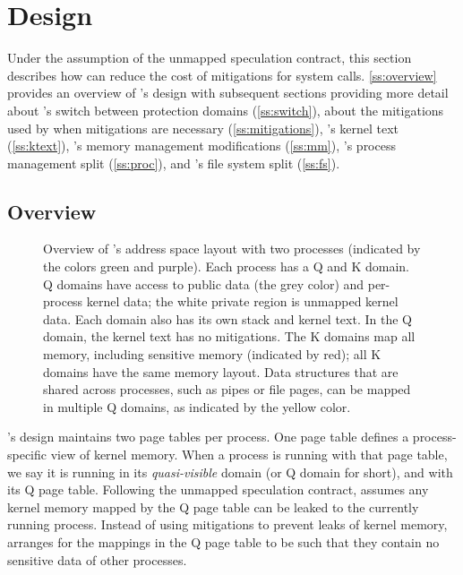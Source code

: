 \section{Design}
\label{s:design}

Under the assumption of the unmapped speculation contract, this
section describes how \sys can reduce the cost of mitigations for
system calls.  \autoref{ss:overview} provides an overview of \sys's
design with subsequent sections providing more detail about \sys's
switch between protection domains (\autoref{ss:switch}), about the
mitigations used by \sys when mitigations are necessary
(\autoref{ss:mitigations}), \sys's kernel text (\autoref{ss:ktext}),
\sys's memory management modifications (\autoref{ss:mm}), \sys's
process management split (\autoref{ss:proc}), and \sys's file system
split (\autoref{ss:fs}).

\subsection{Overview}
\label{ss:overview}

\begin{figure}[t]
  \begin{center}
    
  \end{center}
  \vspace{-2\baselineskip}
  \caption{Overview of \sys's address space layout with two processes
    (indicated by the colors green and purple). Each process has a Q
    and K domain. Q domains have access to public data (the grey
    color) and per-process kernel data; the
    white private region is unmapped kernel data. Each domain also has
    its own stack and kernel text. In the Q domain, the kernel text
    has no mitigations. The K domains map all memory, including
    sensitive memory (indicated by red); all K domains have the same
    memory layout. Data structures that are shared across processes,
    such as pipes or file pages, can be mapped in multiple Q domains,
    as indicated by the yellow color.}
\label{fig:overview}
\end{figure}

\sys's design maintains two page tables per process.  One page table
defines a process-specific view of kernel memory.  When a process is
running with that page table, we say it is running in its
\textit{quasi-visible} domain (or Q domain for short), and with its Q page
table.  Following the unmapped speculation contract, \sys assumes any
kernel memory mapped by the Q page table can be leaked to the
currently running process.  Instead of using mitigations to prevent
leaks of kernel memory, \sys arranges for the mappings in the Q page
table to be such that they contain no sensitive data of other
processes.

